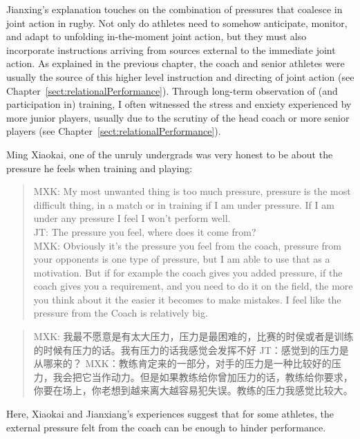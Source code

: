 \begin{CJK}{UTF8}{gbsn}
Jianxing's explanation touches on the combination of pressures that coalesce in joint action in rugby.  Not only do athletes need to somehow anticipate, monitor, and adapt to unfolding in-the-moment joint action, but they must also incorporate instructions arriving from sources external to the immediate joint action.  As explained in the previous chapter, the coach and senior athletes were usually the source of this higher level instruction and directing of joint action (see Chapter~\ref{sect:relationalPerformance}).  Through long-term observation of (and participation in) training, I often witnessed the stress and enxiety experienced by more junior players, usually due to the scrutiny of the head coach or more senior players (see Chapter~\ref{sect:relationalPerformance}).

Ming Xiaokai, one of the unruly undergrads was very honest to be about the pressure he feels when training and playing:

    \begin{quote}
      MXK: My most unwanted thing is too much pressure, pressure is the most difficult thing, in a match or in training if I am under pressure.  If I am under any pressure I feel I won't perform well. \\
      JT: The pressure you feel, where does it come from? \\
      MXK: Obviously it's the pressure you feel from the coach, pressure from your opponents is one type of pressure, but I am able to use that as a motivation. But if for example the coach gives you added pressure, if the coach gives you a requirement, and you need to do it on the field, the more you think about it the easier it becomes to make mistakes.  I feel like the pressure from the Coach is relatively big.
    \end{quote}

    \begin{quote}
      MXK: 我最不愿意是有太大压力，压力是最困难的，比赛的时侯或者是训练的时候有压力的话。我有压力的话我感觉会发挥不好
      JT：感觉到的压力是从哪来的？
      MXK：教练肯定来的一部分，对手的压力是一种比较好的压力，我会把它当作动力。但是如果教练给你曾加压力的话，教练给你要求，你要在场上，你老想到越来离大越容易犯失误。教练的压力我感觉比较大。
    \end{quote}

Here, Xiaokai and Jianxiang's experiences suggest that for some athletes, the external pressure felt from the coach can be enough to hinder performance.


\end{CJK}
